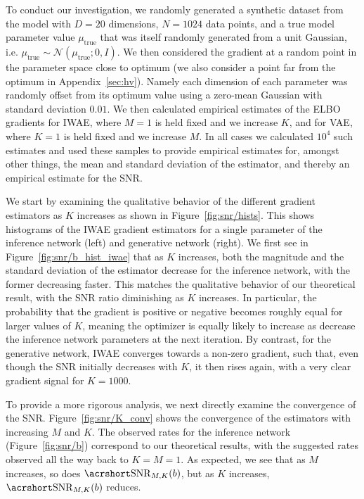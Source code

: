 To conduct our investigation, we randomly generated a synthetic dataset from the model with $D=20$
dimensions, $N=1024$ data points, and a true model parameter value $\mu_{\text{true}}$ that was itself 
randomly generated from a unit Gaussian, i.e. $\mu_{\text{true}} \sim \mathcal{N}(\mu_{\text{true}} ;0,I)$.
We then considered the gradient at a random point in the parameter space close to optimum (we also 
	consider a point far from the optimum in 
	Appendix~\ref{sec:hv}). Namely
each dimension of each parameter was randomly offset from its optimum value using a zero-mean
Gaussian with standard deviation $0.01$.  We then calculated empirical estimates of the \gls{ELBO}
gradients for \gls{IWAE}, where $M=1$ is held fixed and we increase $K$, and
for \gls{VAE}, where $K=1$ is held fixed and we increase $M$.  In all cases we 
calculated $10^4$ such estimates and used these samples to provide empirical estimates for, amongst other things, the
mean and standard deviation of the estimator, and thereby an empirical estimate for the \gls{SNR}.

We start by examining the qualitative behavior of the different gradient estimators as $K$ increases as
shown in Figure~\ref{fig:snr/hists}.  This shows histograms of the \gls{IWAE}  gradient estimators
for a single parameter of the inference network (left) and generative network (right).
We first see in Figure~\ref{fig:snr/b_hist_iwae} that as $K$ increases, both the magnitude and the standard
deviation of the estimator decrease for the inference network, 
with the former decreasing faster.  This
matches the qualitative behavior of our theoretical result, with the \gls{SNR} ratio 
diminishing as $K$ increases.
In particular, the probability that the gradient is positive or negative 
becomes roughly equal for larger
values of $K$, meaning the optimizer is equally likely to increase as decrease the 
inference network parameters at the next iteration.
By contrast, for the generative network, \gls{IWAE} converges towards a 
non-zero gradient, such that,
even though the \gls{SNR} initially decreases with $K$, it then rises again, with a very
clear gradient signal for $K=1000$.


To provide a more rigorous analysis, we next directly examine the convergence of 
the \gls{SNR}.
Figure~\ref{fig:snr/K_conv} shows the convergence of the estimators with increasing $M$ and $K$.
The observed rates for the inference network (Figure~\ref{fig:snr/b})
correspond to our theoretical results, with
the suggested rates observed all the way back to $K=M=1$.  As expected, we see 
that as $M$ increases, so does $\SNR_{M,K}(b)$, but as $K$ increases, $\SNR_{M,K}(b)$ reduces.

